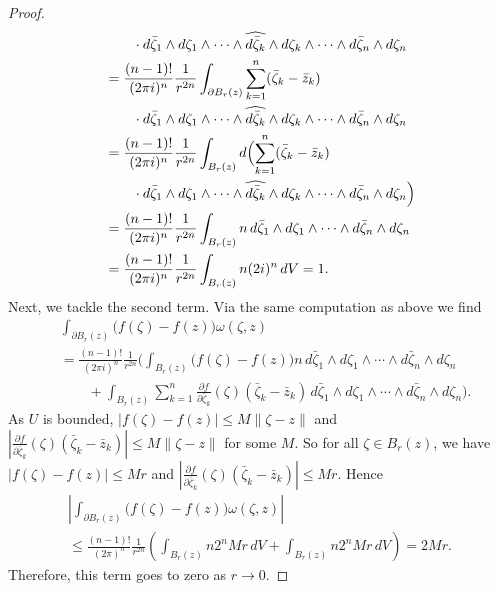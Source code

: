 \documentclass[UTF8,11pt]{ctexart}
\theoremstyle{definition}
\begin{document}
\begin{proof}
\begin{align*}
&\qquad\cdot d\bar\zeta_1\wedge d\zeta_1\wedge\cdots\wedge\widehat{d\bar\zeta_k}\wedge d\zeta_k\wedge\cdots\wedge d\bar\zeta_n\wedge d\zeta_n\\
&=\frac{(n-1)!}{(2\pi i)^n}\frac1{r^{2n}}\int_{\partial B_r(z)}\sum_{k=1}^n(\bar\zeta_k-\bar z_k)\\
&\qquad\cdot d\bar\zeta_1\wedge d\zeta_1\wedge\cdots\wedge\widehat{d\bar\zeta_k}\wedge d\zeta_k\wedge\cdots\wedge d\bar\zeta_n\wedge d\zeta_n\\
&=\frac{(n-1)!}{(2\pi i)^n}\frac1{r^{2n}}\int_{B_r(z)}d\Bigl(\sum_{k=1}^n(\bar\zeta_k-\bar z_k)\\
&\qquad\cdot d\bar\zeta_1\wedge d\zeta_1\wedge\cdots\wedge\widehat{d\bar\zeta_k}\wedge d\zeta_k\wedge\cdots\wedge d\bar\zeta_n\wedge d\zeta_n\Bigr)\\
&=\frac{(n-1)!}{(2\pi i)^n}\frac1{r^{2n}}\int_{B_r(z)}n\,d\bar\zeta_1\wedge d\zeta_1\wedge\cdots\wedge d\bar\zeta_n\wedge d\zeta_n\\
&=\frac{(n-1)!}{(2\pi i)^n}\frac1{r^{2n}}\int_{B_r(z)}n(2i)^n\,dV=1.
\end{align*}
Next, we tackle the second term. Via the same computation as above we find
\begin{align*}
&\int_{\partial B_r(z)}\bigl(f(\zeta)-f(z)\bigr)\omega(\zeta,z)\\
&=\frac{(n-1)!}{(2\pi i)^n}\frac1{r^{2n}}\Biggl(\int_{B_r(z)}\bigl(f(\zeta)-f(z)\bigr)n\,d\bar\zeta_1\wedge d\zeta_1\wedge\cdots\wedge d\bar\zeta_n\wedge d\zeta_n\\
&\qquad+\int_{B_r(z)}\sum_{k=1}^n\frac{\partial f}{\partial\bar\zeta_k}(\zeta)(\bar\zeta_k-\bar z_k)\,d\bar\zeta_1\wedge d\zeta_1\wedge\cdots\wedge d\bar\zeta_n\wedge d\zeta_n\Biggr).
\end{align*}
As $U$ is bounded, $|f(\zeta)-f(z)|\leq M\|\zeta-z\|$ and $\left|\frac{\partial f}{\partial\bar\zeta_k}(\zeta)(\bar\zeta_k-\bar z_k)\right|\leq M\|\zeta-z\|$ for some $M$. So for all $\zeta\in B_r(z)$, we have $|f(\zeta)-f(z)|\leq Mr$ and $\left|\frac{\partial f}{\partial\bar\zeta_k}(\zeta)(\bar\zeta_k-\bar z_k)\right|\leq Mr$. Hence
\begin{multline*}
\left|\int_{\partial B_r(z)}\bigl(f(\zeta)-f(z)\bigr)\omega(\zeta,z)\right|\\
\leq\frac{(n-1)!}{(2\pi)^n}\frac1{r^{2n}}\left(\int_{B_r(z)}n2^nMr\,dV+\int_{B_r(z)}n2^nMr\,dV\right)=2Mr.
\end{multline*}
Therefore, this term goes to zero as $r\to0$.
\end{proof}
\end{document}
